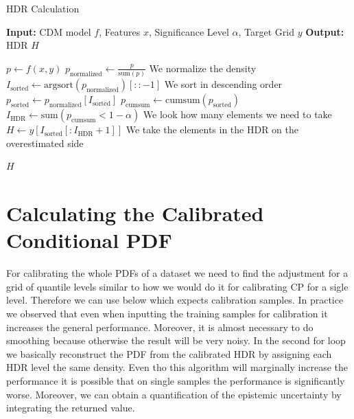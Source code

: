 \begin{algorithm}
    \caption{HDR Calculation}\label{alg:hdr}
    \begin{algorithmic}
        \STATE\textbf{Input:} CDM model $f$, Features $x$, Significance Level $\alpha$, Target Grid $y$
        \STATE\textbf{Output:} HDR $H$

        \STATE$p \leftarrow f(x, y)$
        \STATE$p_{\text{normalized}} \leftarrow \frac{p}{\text{sum}(p)}$ We normalize the density
        \STATE$I_{\text{sorted}} \leftarrow \text{argsort}(p_{\text{normalized}})[::-1]$ We sort in descending order
        \STATE$p_{\text{sorted}} \leftarrow p_{\text{normalized}}[I_{\text{sorted}}]$
        \STATE$p_{\text{cumsum}} \leftarrow \text{cumsum}(p_{\text{sorted}})$
        \STATE$I_{\text{HDR}} \leftarrow \text{sum}(p_{\text{cumsum}} < 1 - \alpha)$ We look how many elements we need to take
        \STATE$H \leftarrow y[I_{\text{sorted}}[:I_{\text{HDR}} + 1]]$ We take the elements in the HDR on the overestimated side

        \RETURN$H$
    \end{algorithmic}
\end{algorithm}

\section{Calculating the Calibrated Conditional PDF}

For calibrating the whole PDFs of a dataset we need to find the adjustment for a grid of quantile levels similar to how we would do it for calibrating CP for a sigle level. Therefore we can use  below which expects calibration samples. In practice we observed that even when inputting the training samples for calibration it increases the general performance. Moreover, it is almost necessary to do smoothing because otherwise the result will be very noisy. In the second for loop we basically reconstruct the PDF from the calibrated HDR by assigning each HDR level the same density. Even tho this algorithm will marginally increase the performance it is possible that on single samples the performance is significantly worse. Moreover, we can obtain a quantification of the epistemic uncertainty by integrating the returned value.

